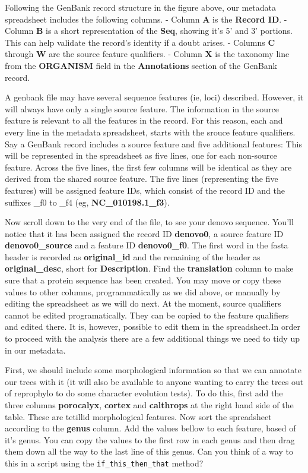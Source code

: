 \documentclass[letterpaper,10pt,english]{/usr/share/sphinx/texinputs/sphinxhowto}
\begin{document}
        
    
Following the GenBank record structure in the figure above, our metadata
spreadsheet includes the following columns. - Column \textbf{A} is the
\textbf{Record ID}. - Column \textbf{B} is a short representation of the
\textbf{Seq}, showing it's 5' and 3' portions. This can help validate
the record's identity if a doubt arises. - Columns \textbf{C} through
\textbf{W} are the source feature qualifiers. - Column \textbf{X} is the
taxonomy line from the \textbf{ORGANISM} field in the
\textbf{Annotations} section of the GenBank record.

A genbank file may have several sequence features (ie, loci) described.
However, it will always have only a single source feature. The
information in the source feature is relevant to all the features in the
record. For this reason, each and every line in the metadata
spreadsheet, starts with the srouce feature qualifiers. Say a GenBank
record includes a source feature and five additional features: This will
be represented in the spreadsheet as five lines, one for each non-source
feature. Across the five lines, the first few columns will be identical
as they are derived from the shared source feature. The five lines
(representing the five features) will be assigned feature IDs, which
consist of the record ID and the suffixes \_f0 to \_f4 (eg,
\textbf{NC\_010198.1\_f3}).

Now scroll down to the very end of the file, to see your denovo
sequence. You'll notice that it has been assigned the record ID
\textbf{denovo0}, a source feature ID \textbf{denovo0\_source} and a
feature ID \textbf{denovo0\_f0}. The first word in the fasta header is
recorded as \textbf{original\_id} and the remaining of the header as
\textbf{original\_desc}, short for \textbf{Description}. Find the
\textbf{translation} column to make sure that a protein sequence has
been created. You may move or copy these values to other columns,
programmatically as we did above, or manually by editing the spreadsheet
as we will do next. At the moment, source qualifiers cannot be edited
programatically. They can be copied to the feature qualifiers and edited
there. It is, however, possible to edit them in the spreadsheet.In order to proceed with the analysis there are a few additional things
we need to tidy up in our metadata.

First, we should include some morphological information so that we can
annotate our trees with it (it will also be available to anyone wanting
to carry the trees out of reprophylo to do some character evolution
tests). To do this, first add the three columns \textbf{porocalyx},
\textbf{cortex} and \textbf{calthrops} at the right hand side of the
table. These are tetillid morphological features. Now sort the
spreadsheet according to the \textbf{genus} column. Add the values
bellow to each feature, based of it's genus. You can copy the values to
the first row in each genus and then drag them down all the way to the
last line of this genus. Can you think of a way to this in a script
using the \texttt{if\_this\_then\_that} method?
\end{document}
